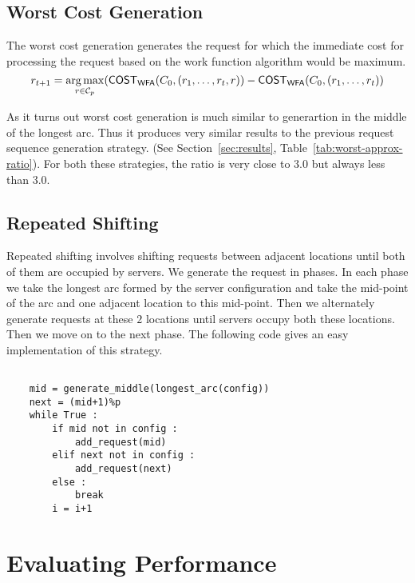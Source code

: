 \subsection{Worst Cost Generation}

The worst cost generation generates the request for which the immediate cost for processing the request based on the work function algorithm would be maximum. 
$$ r_{t+1} = \operatorname*{arg\,max}_{r\in \mathcal{C}_p} (\mathsf {COST}_{\mathsf {WFA}} (C_0,(r_1,\hdots,r_t,r)) - \mathsf {COST}_{\mathsf {WFA}} (C_0,(r_1,\hdots,r_t)) $$

As it turns out worst cost generation is much similar to generartion in the middle of the longest arc. Thus it produces very similar results to the previous request sequence generation strategy. (See Section~\ref{sec:results}, Table~\ref{tab:worst-approx-ratio}). For both these strategies, the ratio is very close to $3.0$ but always less than $3.0$.

\subsection{Repeated Shifting}\label{subsec:repeated-shifting}

Repeated shifting involves shifting requests between adjacent locations until both of them are occupied by servers. We generate the request in phases. In each phase we take the longest arc formed by the server configuration and take the mid-point of the arc and one adjacent location to this mid-point. Then we alternately generate requests at these $2$ locations until servers occupy both these locations. Then we move on to the next phase. The following code gives an easy implementation of this strategy.

\begin{lstlisting}[caption=Code for single phase of repeated shifting , frame=single]  % Start your code-block

	mid = generate_middle(longest_arc(config))
	next = (mid+1)%p
	while True :
		if mid not in config :
			add_request(mid)
		elif next not in config :
			add_request(next)
		else :
			break
		i = i+1

\end{lstlisting}



\section{Evaluating Performance}\label{sec:evaluating-performance}

